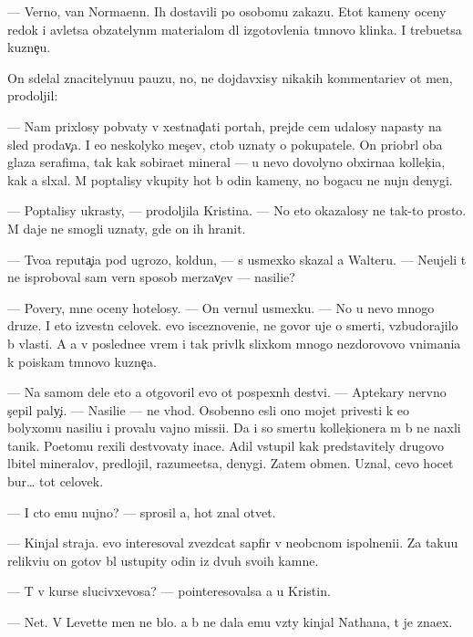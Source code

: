 \documentclass[10pt]{book}
\begin{document}
— Verno, van Normaenn. Ih dostavili po osobomu zakazu. Etot kameny oceny redok i {\y}avl{\ia}{\y}etsa ob{\ia}zatelyn{\yi}m materialom dl{\ia} izgotovleni{\y}a t{\e}mnovo klinka. I trebu{\y}etsa kuzne{\c}u.

On sdelal znacitelynu{\y}u pauzu, no, ne dojdavxisy nikakih kommentari{\y}ev ot men{\ia}, prodoljil:

— Nam pri\-xlosy pob{\yi}vaty v xestnad{\c}ati portah, prejde cem udalosy napasty na sled prodav{\c}a. I {\y}e{\x}o neskolyko mes{\ia}{\c}ev, ctob{\yi} uznaty o pokupatele. On priobr{\e}l oba glaza serafima, tak kak sobira{\y}et mineral{\yi} — u nevo dovolyno obxirna{\y}a kollek{\c}i{\y}a, kak {\y}a sl{\yi}xal. M{\yi} pop{\yi}talisy v{\yi}kupity hot{\ia} b{\yi} odin kameny, no bogacu ne nujn{\yi} denygi.

— Pop{\yi}talisy ukrasty, — prodoljila Kristina. — No eto okazalosy ne tak-to prosto. M{\yi} daje ne smogli uznaty, gde on ih hranit.

— Tvo{\y}a reputa{\c}i{\y}a pod ugrozo{\y}, koldun, — s usmexko{\y} skazal {\y}a Walteru. — Neujeli t{\yi} ne isproboval sam{\yi}{\y} vern{\yi}{\y} sposob merzav{\c}ev — nasili{\y}e?

— Povery, mne oceny hotelosy. — On vernul usmexku. — No u nevo mnogo druze{\y}. I eto izvestn{\yi}{\y} celovek. {\Y}evo isceznoveni{\y}e, ne go\-vo\-r{\ia} uje o smerti, vzbudorajilo b{\yi} vlasti. A {\y}a v posledne{\y}e vrem{\ia} i tak privl{\e}k slixkom mnogo nezdorovovo vnimani{\y}a k poiskam t{\e}mnovo kuzne{\c}a.

— Na samom dele eto {\y}a otgovoril {\y}evo ot pospexn{\yi}h de{\y}stvi{\y}. — Aptekary nervno s{\c}epil paly{\c}i. — Nasili{\y}e — ne v{\yi}hod. Osobenno {\y}esli ono mojet privesti k {\y}e{\x}o bolyxomu nasili{\y}u i provalu vajno{\y} missi{\y}i. Da i so smert{\y}u kollek{\c}ionera m{\yi} b{\yi} ne naxli ta{\y}nik. Poetomu rexili de{\y}stvovaty inace. Adil v{\yi}stupil kak predstavitely drugovo l{\io}bitel{\ia} mineralov, predlojil, razume{\y}etsa, denygi. Zatem obmen. Uznal, cevo hocet bur… tot celovek.

— I cto {\y}emu nujno? — sprosil {\y}a, hot{\ia} znal otvet.

— Kinjal straja. {\Y}evo interesoval zvezd\-ca\-t{\yi}{\y} sapfir v neob{\yi}cnom ispolneni{\y}i. Za taku{\y}u relikvi{\y}u on gotov b{\yi}l ustupity odin iz dvuh svo{\y}ih kamne{\y}.

— T{\yi} v kurse slucivxevosa? — pointeresovalsa {\y}a u Kristin{\yi}.

— Net. V Levette men{\ia} ne b{\yi}lo. {\Y}a b{\yi} ne dala {\y}emu vz{\ia}ty kinjal Nathana, t{\yi} je zna\-{\y}ex.
\end{document}
